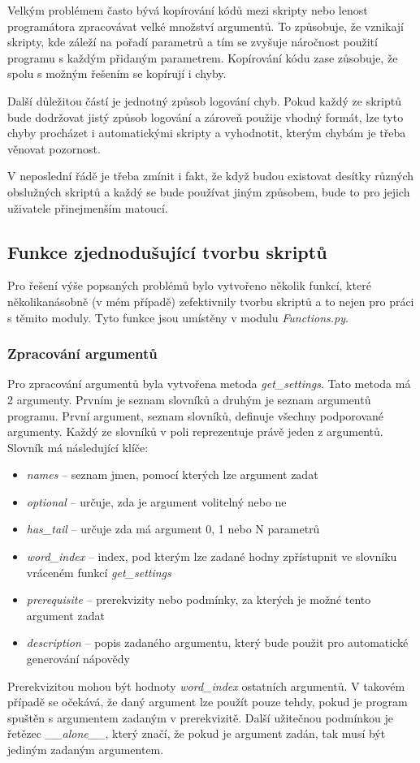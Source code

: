 Velkým problémem často bývá kopírování kódů mezi skripty nebo lenost programátora zpracovávat
velké množství argumentů. To způsobuje, že vznikají skripty, kde záleží na pořadí parametrů
a tím se zvyšuje náročnost použití programu s každým přidaným parametrem.
Kopírování kódu zase zůsobuje, že spolu s možným řešením se kopírují i chyby.

Další důležitou částí je jednotný způsob logování chyb. Pokud každý ze skriptů bude dodržovat
jistý způsob logování a zároveň použije vhodný formát, lze tyto chyby procházet i automatickými
skripty a vyhodnotit, kterým chybám je třeba věnovat pozornost.

V neposlední řádě je třeba zmínit i fakt, že když budou existovat desítky různých obslužných skriptů
a každý se bude používat jiným způsobem, bude to pro jejich uživatele přinejmenším matoucí.

\subsection{Funkce zjednodušující tvorbu skriptů}
Pro řešení výše popsaných problémů bylo vytvořeno několik funkcí, které několikanásobně (v mém případě)
zefektivnily tvorbu skriptů a to nejen pro práci s těmito moduly. Tyto funkce jsou umístěny v modulu
\textit{Functions.py}.

\subsubsection{Zpracování argumentů}
Pro zpracování argumentů byla vytvořena metoda \textit{get\_settings}. Tato metoda má 2 argumenty.
Prvním je seznam slovníků a druhým je seznam argumentů programu. První argument, seznam slovníků, definuje
všechny podporované argumenty. Každý ze slovníků v poli reprezentuje právě jeden z argumentů.
Slovník má následující klíče:
\begin{itemize}
    \item \textit{names} -- seznam jmen, pomocí kterých lze argument zadat
    \item \textit{optional} -- určuje, zda je argument volitelný nebo ne
    \item \textit{has\_tail} -- určuje zda má argument 0, 1 nebo N parametrů
    \item \textit{word\_index} -- index, pod kterým lze zadané hodny zpřístupnit ve slovníku vráceném funkcí \textit{get\_settings}
    \item \textit{prerequisite} -- prerekvizity nebo podmínky, za kterých je možné tento argument zadat
    \item \textit{description} -- popis zadaného argumentu, který bude použit pro automatické generování nápovědy
\end{itemize}
Prerekvizitou mohou být hodnoty \textit{word\_index} ostatních argumentů. V takovém případě se očekává,
že daný argument lze použít pouze tehdy, pokud je program spuštěn s argumentem zadaným v prerekvizitě.
Další užitečnou podmínkou je řetězec \textit{\_\_alone\_\_}, který značí, že pokud je argument zadán,
tak musí být jediným zadaným argumentem.

